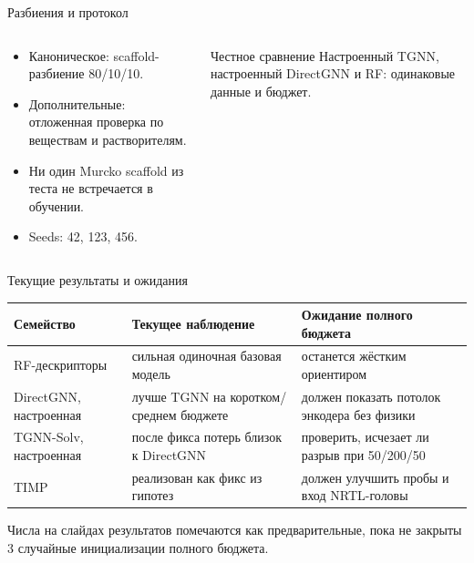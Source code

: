 \documentclass[aspectratio=169,10pt]{beamer}
\newcommand{\smallnote}[1]{{\scriptsize\color{TGSlate}#1}}
\newcommand{\tightitems}{\setlength{\itemsep}{0.25em}}
\begin{document}
\begin{frame}{Разбиения и протокол}
  \begin{columns}[T,onlytextwidth]
    \begin{column}{0.52\textwidth}
      \begin{itemize}\tightitems
        \item Каноническое: scaffold-разбиение 80/10/10.
        \item Дополнительные: отложенная проверка по веществам и растворителям.
        \item Ни один Murcko scaffold из теста не встречается в обучении.
        \item Seeds: 42, 123, 456.
      \end{itemize}
    \end{column}
    \begin{column}{0.44\textwidth}
      \begin{block}{Честное сравнение}
        Настроенный TGNN, настроенный DirectGNN и RF: одинаковые данные и бюджет.
      \end{block}
    \end{column}
  \end{columns}
\end{frame}

\begin{frame}{Текущие результаты и ожидания}
  \small
  \begin{tabularx}{\textwidth}{lYY}
    \toprule
    \textbf{Семейство} & \textbf{Текущее наблюдение} & \textbf{Ожидание полного бюджета}\\
    \midrule
    RF-дескрипторы & сильная одиночная базовая модель & останется жёстким ориентиром\\
    DirectGNN, настроенная & лучше TGNN на коротком/среднем бюджете & должен показать потолок энкодера без физики\\
    TGNN-Solv, настроенная & после фикса потерь близок к DirectGNN & проверить, исчезает ли разрыв при 50/200/50\\
    TIMP & реализован как фикс из гипотез & должен улучшить пробы и вход NRTL-головы\\
    \bottomrule
  \end{tabularx}
  \vspace{0.5em}
  \smallnote{Числа на слайдах результатов помечаются как предварительные, пока не закрыты 3 случайные инициализации полного бюджета.}
\end{frame}
\end{document}
